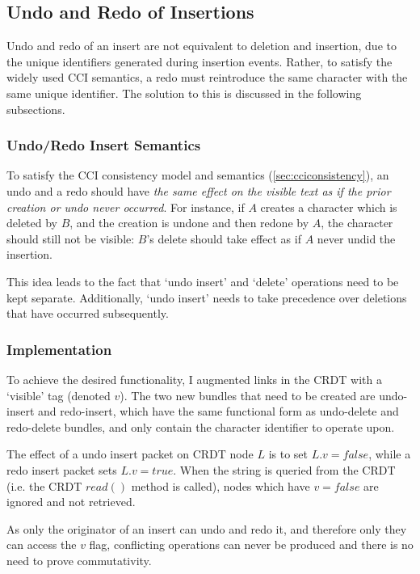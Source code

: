 \documentclass[12pt,a4paper,twoside,openright]{report}
\begin{document}
	
	\subsection{Undo and Redo of Insertions}
	Undo and redo of an insert are not equivalent to deletion and insertion, due to the unique identifiers generated during insertion events. Rather, to satisfy the widely used CCI semantics, a redo must reintroduce the same character with the same unique identifier. The solution to this is discussed in the following subsections.
	
		\subsubsection{Undo/Redo Insert Semantics}
		To satisfy the CCI consistency model and semantics (\cref{sec:cciconsistency}), an undo and a redo should have \textit{the same effect on the visible text as if the prior creation or undo never occurred}. For instance, if $A$ creates a character which is deleted by $B$, and the creation is undone and then redone by $A$, the character should still not be visible: $B$'s delete should take effect as if $A$ never undid the insertion.
		
		This idea leads to the fact that `undo insert' and `delete' operations need to be kept separate. Additionally, `undo insert' needs to take precedence over deletions that have occurred subsequently.
		
		\subsubsection{Implementation}
		
		To achieve the desired functionality, I augmented links in the CRDT with a `visible' tag (denoted $v$). The two new bundles that need to be created are undo-insert and redo-insert, which have the same functional form as undo-delete and redo-delete bundles, and only contain the character identifier to operate upon.
		
		The effect of a undo insert packet on CRDT node $L$ is to set $L.v = false$, while a redo insert packet sets $L.v = true$. When the string is queried from the CRDT (i.e. the CRDT 
		$read()$ method is called), nodes which have $v = false$ are ignored and not retrieved.
		
		As only the originator of an insert can undo and redo it, and therefore only they can access the $v$ flag, conflicting operations can never be produced and there is no need to prove commutativity.
		
\end{document}
